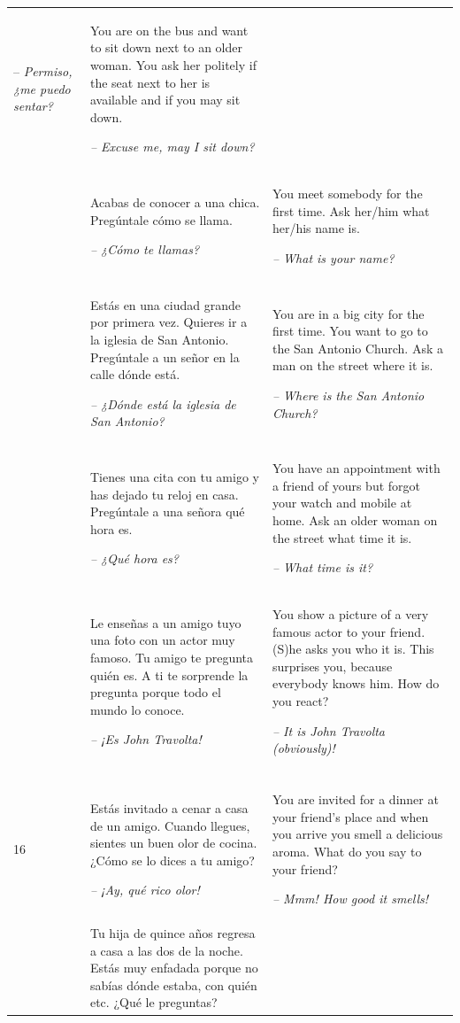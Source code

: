 \begin{xltabular}{\textwidth}{lQQ}
-- \textit{Permiso, ¿me puedo sentar?} & You are on the bus and want to sit down next to an older woman. You ask her politely if the seat next to her is available and if you may sit down.

{\itshape -- Excuse me, may I sit down?}\\
 & Acabas de conocer a una chica. Pregúntale cómo se llama.

\textit{-- ¿Cómo te llamas?} & You meet somebody for the first time. Ask her/him what her/his name is.

{\itshape -- What is your name?}\\
 & Estás en una ciudad grande por primera vez. Quieres ir a la iglesia de San Antonio. Pregúntale a un señor en la calle dónde está.

\textit{-- ¿Dónde está la iglesia de San Antonio?} & You are in a big city for the first time. You want to go to the San Antonio Church. Ask a man on the street where it is.

{\itshape -- Where is the San Antonio Church?}\\
 & Tienes una cita con tu amigo y has dejado tu reloj en casa. Pregúntale a una señora qué hora es.

\textit{-- ¿Qué hora es?} & You have an appointment with a friend of yours but forgot your watch and mobile at home. Ask an older woman on the street what time it is.

{\itshape -- What time is it?}\\
 & Le enseñas a un amigo tuyo una foto con un actor muy famoso. Tu amigo te pregunta quién es. A ti te sorprende la pregunta porque todo el mundo lo conoce.

\textit{-- ¡Es John Travolta!} & You show a picture of a very famous actor to your friend. (S)he asks you who it is. This surprises you, because everybody knows him. How do you react?

{\itshape -- It is John Travolta (obviously)!}\\
\\
16 & Estás invitado a cenar a casa de un amigo. Cuando llegues, sientes un buen olor de cocina. ¿Cómo se lo dices a tu amigo?

\textit{-- ¡Ay, qué rico olor!} & You are invited for a dinner at your friend’s place and when you arrive you smell a delicious aroma. What do you say to your friend?

{\itshape -- Mmm! How good it smells!}\\
 & Tu hija de quince años regresa a casa a las dos de la noche. Estás muy enfadada porque no sabías dónde estaba, con quién etc. ¿Qué le preguntas?


\end{xltabular}
